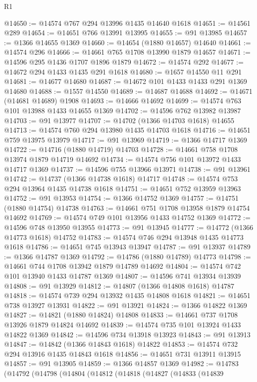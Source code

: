 \begin{lexlean}{R1}
\begin{coremodule}
@14650 := @14574 @767 @294 @13996 @1435 @14640 @1618
@14651 := @14561 @289
@14654 := @14651 @766 @13991 @13995
@14655 := @91 @13985
@14657 := @1366 @14655 @1369
@14660 := @14654 (@1880 @14657) @14640
@14661 := @14574 @296
@14666 := @14661 @765 @1708 @13990 @1879 @14657
@14671 := @14596 @295 @1436 @1707 @1896 @1879
@14672 := @14574 @292
@14677 := @14672 @294 @1433 @1435 @291 @1618
@14680 := @1657 @14550 @11 @291
@14681 := @14677 @14680
@14687 := @14672 @101 @1433 @1433 @291 @1369 @14680
@14688 := @1557 @14550
@14689 := @14687 @14688
@14692 := @14671 (@14681 @14689) @1908
@14693 := @14666 @14692
@14699 := @14574 @763 @101 @13988 @1433 @14655 @1369
@14702 := @14596 @762 @13982 @13987
@14703 := @91 @13977
@14707 := @14702 (@1366 @14703 @1618) @14655
@14713 := @14574 @760 @294 @13980 @1435 @14703 @1618
@14716 := @14651 @759 @13975 @13979
@14717 := @91 @13969
@14719 := @1366 @14717 @1369
@14722 := @14716 (@1880 @14719) @14703
@14728 := @14661 @758 @1708 @13974 @1879 @14719 @14692
@14734 := @14574 @756 @101 @13972 @1433 @14717 @1369
@14737 := @14596 @755 @13966 @13971
@14738 := @91 @13961
@14742 := @14737 (@1366 @14738 @1618) @14717
@14748 := @14574 @753 @294 @13964 @1435 @14738 @1618
@14751 := @14651 @752 @13959 @13963
@14752 := @91 @13953
@14754 := @1366 @14752 @1369
@14757 := @14751 (@1880 @14754) @14738
@14763 := @14661 @751 @1708 @13958 @1879 @14754 @14692
@14769 := @14574 @749 @101 @13956 @1433 @14752 @1369
@14772 := @14596 @748 @13950 @13955
@14773 := @91 @13945
@14777 := @14772 (@1366 @14773 @1618) @14752
@14783 := @14574 @746 @294 @13948 @1435 @14773 @1618
@14786 := @14651 @745 @13943 @13947
@14787 := @91 @13937
@14789 := @1366 @14787 @1369
@14792 := @14786 (@1880 @14789) @14773
@14798 := @14661 @744 @1708 @13942 @1879 @14789 @14692
@14804 := @14574 @742 @101 @13940 @1433 @14787 @1369
@14807 := @14596 @741 @13934 @13939
@14808 := @91 @13929
@14812 := @14807 (@1366 @14808 @1618) @14787
@14818 := @14574 @739 @294 @13932 @1435 @14808 @1618
@14821 := @14651 @738 @13927 @13931
@14822 := @91 @13921
@14824 := @1366 @14822 @1369
@14827 := @14821 (@1880 @14824) @14808
@14833 := @14661 @737 @1708 @13926 @1879 @14824 @14692
@14839 := @14574 @735 @101 @13924 @1433 @14822 @1369
@14842 := @14596 @734 @13918 @13923
@14843 := @91 @13913
@14847 := @14842 (@1366 @14843 @1618) @14822
@14853 := @14574 @732 @294 @13916 @1435 @14843 @1618
@14856 := @14651 @731 @13911 @13915
@14857 := @91 @13905
@14859 := @1366 @14857 @1369
@14982 := @14783
    (@14792
      (@14798
        (@14804
          (@14812
            (@14818
              (@14827
                (@14833
                  (@14839

\end{coremodule}
\end{lexlean}
